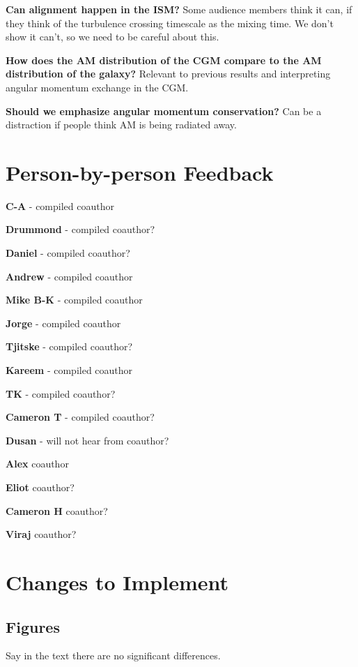 \textbf{Can alignment happen in the ISM?}
Some audience members think it can, if they think of the turbulence crossing timescale as the mixing time.
We don't show it can't, so we need to be careful about this.

\textbf{How does the AM distribution of the CGM compare to the AM distribution of the galaxy?}
Relevant to previous results and interpreting angular momentum exchange in the CGM.

\textbf{Should we emphasize angular momentum conservation?}
Can be a distraction if people think AM is being radiated away.

\section{Person-by-person Feedback}

\textbf{C-A} - compiled
coauthor

\textbf{Drummond} - compiled
coauthor?

\textbf{Daniel} - compiled
coauthor?

\textbf{Andrew} - compiled
coauthor

\textbf{Mike B-K} - compiled
coauthor

\textbf{Jorge} - compiled
coauthor

\textbf{Tjitske} - compiled
coauthor?

\textbf{Kareem} - compiled
coauthor

\textbf{TK} - compiled
coauthor?

\textbf{Cameron T} - compiled
coauthor?

\textbf{Dusan} - will not hear from
coauthor?

\textbf{Alex}
coauthor

\textbf{Eliot}
coauthor?

\textbf{Cameron H}
coauthor?

\textbf{Viraj}
coauthor?

\section{Changes to Implement}

\subsection{Figures}


Say in the text there are no significant differences.

